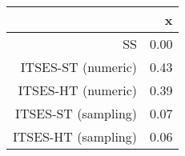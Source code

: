 \begin{table}[ht]
\centering
\begin{tabular}{rr}
  \hline
 & x \\ 
  \hline
SS & 0.00 \\ 
  ITSES-ST (numeric) & 0.43 \\ 
  ITSES-HT (numeric) & 0.39 \\ 
  ITSES-ST (sampling) & 0.07 \\ 
  ITSES-HT (sampling) & 0.06 \\ 
   \hline
\end{tabular}
\end{table}

